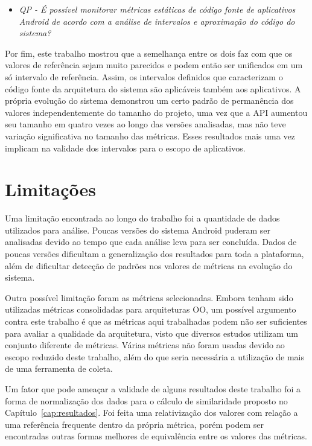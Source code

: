 \begin{itemize}
\item \textit{QP - É possível monitorar métricas estáticas de código fonte de aplicativos Android de acordo com a análise de intervalos e aproximação do código do sistema?}
\end{itemize}

Por fim, este trabalho mostrou que a semelhança entre os dois faz com que os valores de referência sejam muito parecidos e podem então ser unificados em um só intervalo de referência. Assim, os intervalos definidos que caracterizam o código fonte da arquitetura do sistema são aplicáveis também aos aplicativos. A própria evolução do sistema demonstrou um certo padrão de permanência dos valores independentemente do tamanho do projeto, uma vez que a API aumentou seu tamanho em quatro vezes ao longo das versões analisadas, mas não teve variação significativa no tamanho das métricas. Esses resultados mais uma vez implicam na validade dos intervalos para o escopo de aplicativos.

\section{Limitações}

Uma limitação encontrada ao longo do trabalho foi a quantidade de dados utilizados para análise. Poucas versões do sistema Android puderam ser analisadas devido ao tempo que cada análise leva para ser concluída. Dados de poucas versões dificultam a generalização dos resultados para toda a plataforma, além de dificultar detecção de padrões nos valores de métricas na evolução do sistema.

Outra possível limitação foram as métricas selecionadas. Embora tenham sido utilizadas métricas consolidadas para arquiteturas OO, um possível argumento contra este trabalho é que as métricas aqui trabalhadas podem não ser suficientes para avaliar a qualidade da arquitetura, visto que diversos estudos utilizam um conjunto diferente de métricas. Várias métricas não foram usadas devido ao escopo reduzido deste trabalho, além do que seria necessária a utilização de mais de uma ferramenta de coleta.

Um fator que pode ameaçar a validade de alguns resultados deste trabalho foi a forma de normalização dos dados para o cálculo de similaridade proposto no Capítulo~\ref{cap:resultados}. Foi feita uma relativização dos valores com relação a uma referência frequente dentro da própria métrica, porém podem ser encontradas outras formas melhores de equivalência entre os valores das métricas.

